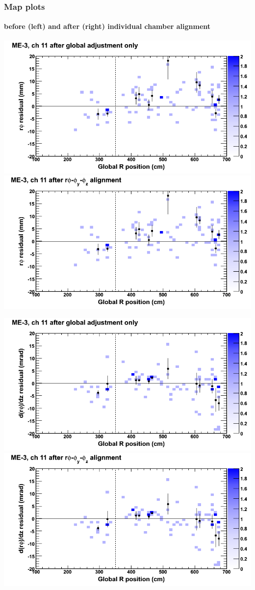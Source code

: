 \documentclass[compress]{beamer}
\begin{document}
\begin{frame}
\frametitle{Map plots}
\framesubtitle{before (left) and after (right) individual chamber alignment}
\includegraphics[width=0.5\linewidth]{ringmapplots_3dof/before_CSCvsr_mem3ch11_x.png} \includegraphics[width=0.5\linewidth]{ringmapplots_3dof/after_CSCvsr_mem3ch11_x.png}

\includegraphics[width=0.5\linewidth]{ringmapplots_3dof/before_CSCvsr_mem3ch11_dxdz.png} \includegraphics[width=0.5\linewidth]{ringmapplots_3dof/after_CSCvsr_mem3ch11_dxdz.png}
\end{frame}
\end{document}
